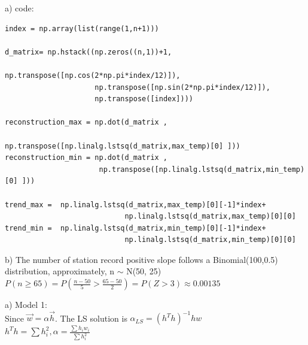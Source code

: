 \documentclass[11pt]{article}
\newenvironment{problem}[2][Problem]{\begin{trivlist}
\item[\hskip \labelsep {\bfseries #1}\hskip \labelsep {\bfseries #2.}]}{\end{trivlist}}
\begin{document}
\begin{problem}{2}
\end{problem}
a) code:
\begin{verbatim}
index = np.array(list(range(1,n+1)))

d_matrix= np.hstack((np.zeros((n,1))+1,      	
							                     np.transpose([np.cos(2*np.pi*index/12)]),
                     np.transpose([np.sin(2*np.pi*index/12)]),
                     np.transpose([index])))

reconstruction_max = np.dot(d_matrix ,
								                      np.transpose([np.linalg.lstsq(d_matrix,max_temp)[0] ]))
reconstruction_min = np.dot(d_matrix , 
                      np.transpose([np.linalg.lstsq(d_matrix,min_temp)[0] ]))

trend_max =  np.linalg.lstsq(d_matrix,max_temp)[0][-1]*index+
                            np.linalg.lstsq(d_matrix,max_temp)[0][0]
trend_min =  np.linalg.lstsq(d_matrix,min_temp)[0][-1]*index+ 
                            np.linalg.lstsq(d_matrix,min_temp)[0][0]

\end{verbatim}

b) The number of station record positive slope follows a Binomial(100,0.5) distribution, approximately, n $\sim$ N(50, 25) \\
$P(n \geq 65) = P(\frac{n-50}{5} >\frac{65-50}{2}) = P(Z>3) \approx 0.00135$\\

\begin{problem}{3}
\end{problem}
a) Model 1:\\
Since $\vec{w} = \alpha \vec{h}$. The LS solution is $\alpha_{LS} = (h^Th)^{-1}hw$\\
$h^Th = \sum h_i^2, \alpha = \frac{\sum h_iw_i}{\sum h_i^2}$\\
\end{document}
